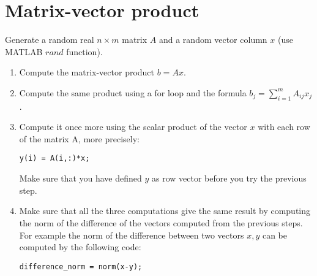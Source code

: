 \section{Matrix-vector product}

Generate a random real $n\times m$ matrix $A$ and a random vector column $x$ (use MATLAB $rand$ function).
\begin{enumerate}
\item Compute the matrix-vector product $b=A x$.
\item Compute the same product using a for loop and the formula $b_{j}=\sum_{i=1}^{m}A_{ij}x_{j}$.
\item Compute it once more using the scalar product of the vector $x$ with each row of the matrix A, more precisely:
\begin{lstlisting}
y(i) = A(i,:)*x;
\end{lstlisting}
Make sure that you have defined $y$ as row vector before you try the previous step.
\item Make sure that all the three computations give the same result by computing 
the norm of the difference of the vectors computed from the previous steps. For example
the norm of the difference between two vectors $x,y$ can be computed by the following code:
\begin{lstlisting}
difference_norm = norm(x-y);
\end{lstlisting}
\end{enumerate}
 









